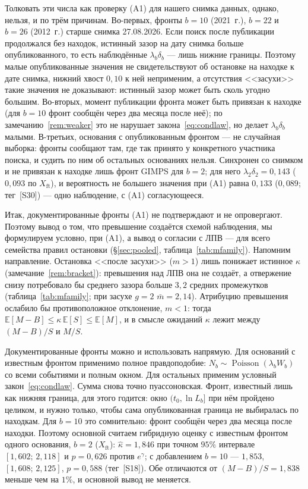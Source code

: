 \documentclass[11pt,a4paper]{article}
\theoremstyle{plain}
\theoremstyle{remark}
\newcommand{\eg}{e^{\gamma}}
\DeclareMathOperator{\Pois}{Poisson}
\begin{document}
Толковать эти числа как проверку (A1) для нашего снимка данных, однако, нельзя, и
по трём причинам. Во-первых, фронты $b=10$ (2021~г.), $b=22$ и $b=26$ (2012~г.)
старше снимка 27.08.2026. Если поиск после публикации продолжался без находок,
истинный зазор на дату снимка больше опубликованного, то есть наблюдённые
$\lambda_b\delta_b$ --- лишь нижние границы. Поэтому малые опубликованные значения не
свидетельствуют об остановке на находке к дате снимка, нижний хвост $0{,}10$ к ней
неприменим, а отсутствия <<засухи>> такие значения не доказывают: истинный зазор может быть сколь угодно большим. Во-вторых, момент
публикации фронта может быть привязан к находке (для $b=10$ фронт сообщён через два
месяца после неё); по замечанию~\ref{rem:weaker} это не нарушает
закона~\eqref{eq:condlaw}, но делает $\lambda_b\delta_b$ малыми. В-третьих,
основания с опубликованным фронтом --- не случайная выборка: фронты сообщают там,
где так принято у конкретного участника поиска, и судить по ним об остальных
основаниях нельзя. Синхронен со снимком и не привязан к находке лишь фронт GIMPS для
$b=2$; для него $\lambda_2\delta_2=0{,}143$ ($0{,}093$ по $X_{\mathrm{ft}}$), и
вероятность не большего значения при (A1) равна $0{,}133$ ($0{,}089$; тег~[S30]) ---
одно наблюдение, с (A1) согласующееся.

Итак, документированные фронты (A1) не подтверждают и не опровергают. Поэтому вывод о
том, что превышение создаётся схемой наблюдения, мы формулируем условно, при (A1), а
вывод о согласии с ЛПВ --- для всего семейства правил остановки (\S\ref{sec:pooled},
таблица~\ref{tab:mfamily}). Напомним направление. Остановка <<после засухи>> ($m>1$)
лишь понижает истинное $\kappa$ (замечание~\ref{rem:bracket}): превышения над ЛПВ
она не создаёт, а отвержение снизу потребовало бы среднего зазора больше $3{,}2$
средних промежутков (таблица~\ref{tab:mfamily}; при засухе $g=2$
$\bar m=2{,}14$). Атрибуцию превышения ослабило бы противоположное
отклонение, $m<1$: тогда $\mathbb E[M-B]\le\kappa\,\mathbb E[S]\le\mathbb E[M]$, и в
смысле ожиданий $\kappa$ лежит между $(M-B)/S$ и $M/S$.

Документированные фронты можно и использовать напрямую. Для оснований с известным
фронтом применимо полное правдоподобие: $N_b\sim\Pois(\lambda_bW_b)$ со всеми
событиями и полным окном. Для остальных применим условный закон~\eqref{eq:condlaw}.
Сумма снова точно пуассоновская. Фронт, известный лишь как нижняя граница, для
этого годится: окно $(t_0,\ln L_b]$ при нём пройдено целиком, и нужно только, чтобы
сама опубликованная граница не выбиралась по находкам. Для $b=10$ это сомнительно:
фронт сообщён через два месяца после находки. Поэтому основной считаем гибридную
оценку с известным фронтом одного основания, $b=2$ ($X_{\mathrm{ft}}$):
$\hat\kappa=1{,}846$ при точном $95\%$ интервале $[1{,}602;\,2{,}118]$ и $p=0{,}626$
против $\eg$; с добавлением $b=10$ --- $1{,}853$, $[1{,}608;\,2{,}125]$, $p=0{,}588$
(тег~[S18]). Обе отличаются от $(M-B)/S=1{,}838$ меньше чем на $1\%$, и основной
вывод не меняется.
\end{document}
